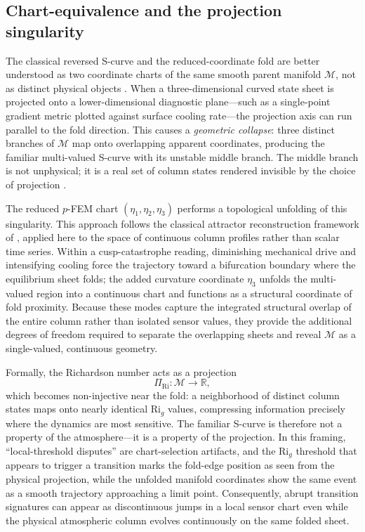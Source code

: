 \documentclass[12pt,a4paper]{article}
\newcommand{\Rig}{\mathrm{Ri}_g}
\begin{document}
\subsection{Chart-equivalence and the projection singularity}

The classical reversed S-curve and the reduced-coordinate fold are better understood as two coordinate charts of the same smooth parent manifold $\mathcal{M}$, not as distinct physical objects \citep{thom1975, zeeman1977}. When a three-dimensional curved state sheet is projected onto a lower-dimensional diagnostic plane---such as a single-point gradient metric plotted against surface cooling rate---the projection axis can run parallel to the fold direction. This causes a \emph{geometric collapse}: three distinct branches of $\mathcal{M}$ map onto overlapping apparent coordinates, producing the familiar multi-valued S-curve with its unstable middle branch. The middle branch is not unphysical; it is a real set of column states rendered invisible by the choice of projection \citep{poston1978}.

The reduced $p$-FEM chart $(\eta_1,\eta_2,\eta_3)$ performs a topological unfolding of this singularity. This approach follows the classical attractor reconstruction framework of \citep{ruelle1971, takens1981}, applied here to the space of continuous column profiles rather than scalar time series. Within a cusp-catastrophe reading, diminishing mechanical drive and intensifying cooling force the trajectory toward a bifurcation boundary where the equilibrium sheet folds; the added curvature coordinate $\eta_3$ unfolds the multi-valued region into a continuous chart and functions as a structural coordinate of fold proximity. Because these modes capture the integrated structural overlap of the entire column rather than isolated sensor values, they provide the additional degrees of freedom required to separate the overlapping sheets and reveal $\mathcal{M}$ as a single-valued, continuous geometry.

Formally, the Richardson number acts as a projection
\begin{equation}
\Pi_{\mathrm{Ri}} : \mathcal{M} \rightarrow \mathbb{R},
\end{equation}
which becomes non-injective near the fold: a neighborhood of distinct column states maps onto nearly identical $\Rig$ values, compressing information precisely where the dynamics are most sensitive. The familiar S-curve is therefore not a property of the atmosphere---it is a property of the projection. In this framing, ``local-threshold disputes'' are chart-selection artifacts, and the $\Rig$ threshold that appears to trigger a transition marks the fold-edge position as seen from the physical projection, while the unfolded manifold coordinates show the same event as a smooth trajectory approaching a limit point.
Consequently, abrupt transition signatures can appear as discontinuous jumps in a local sensor chart even while the physical atmospheric column evolves continuously on the same folded sheet.
\end{document}
